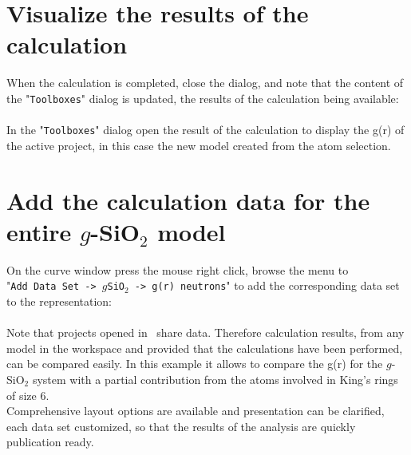 \clearpage

\section{Visualize the results of the calculation} 

When the calculation is completed, close the dialog, and note that the content of the "\texttt{Toolboxes}" dialog 
is updated, the results of the calculation being available:\\[0.5cm]
\toolgrfig
\\[0.5cm]
In the "\texttt{Toolboxes}" dialog open the result of the calculation to display the g(r) of the active project, in this case the new model created from the atom selection. 

\clearpage

\section{Add the calculation data for the entire $g$-SiO$_2$ model}

On the curve window press the mouse right click, browse the menu to "\texttt{Add~Data~Set~->~$g$SiO}$_2$\texttt{~->~g(r)~neutrons}" 
to add the corresponding data set to the representation: \\[0.5cm]
\addfinalfig
\\[0.5cm]
Note that projects opened in \atomes\ share data. Therefore calculation results, from any model in the workspace and provided that the calculations have been performed, can be compared easily. 
In this example it allows to compare the g(r) for the $g$-SiO$_2$ system with a partial contribution from the atoms involved in King's rings of size 6. \\
Comprehensive layout options are available and presentation can be clarified, each data set customized, so that the results of the analysis are quickly publication ready.
